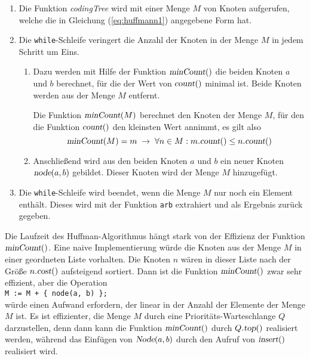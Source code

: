\begin{enumerate}
\item Die Funktion \textsl{codingTree} wird mit einer Menge $M$ von Knoten aufgerufen,
      welche die in Gleichung (\ref{eq:huffmann1}) angegebene Form hat.
\item Die \texttt{while}-Schleife veringert die Anzahl der Knoten in der Menge $M$
      in jedem Schritt um Eins.  
      \begin{enumerate}
      \item Dazu werden mit Hilfe der Funktion $\textsl{minCount}()$ die
            beiden Knoten $a$ und $b$ berechnet, f\"ur die der Wert von $\textsl{count}()$ minimal
            ist.  Beide Knoten werden aus der Menge $M$ entfernt.

            Die Funktion $\textsl{minCount}(M)$ berechnet den Knoten der Menge $M$, f\"ur den 
            die Funktion $\textsl{count}()$ den kleinsten Wert annimmt, es gilt also
            \[ \textsl{minCount}(M) = m \;\rightarrow\; 
               \forall n \in M: m.\textsl{count}() \leq n.\textsl{count}() \]
      \item Anschlie{\ss}end wird aus den beiden Knoten $a$ und $b$ ein neuer Knoten 
            $\textsl{node}(a,b)$ gebildet.
            Dieser Knoten wird der Menge $M$ hinzugef\"ugt.
      \end{enumerate}
\item Die \texttt{while}-Schleife wird beendet, wenn die Menge $M$ nur noch ein Element enth\"alt.
      Dieses wird mit der Funktion \texttt{arb} extrahiert und als Ergebnis zur\"uck gegeben.
\end{enumerate}
Die Laufzeit des Huffman-Algorithmus h\"angt stark von der Effizienz der Funktion $\textsl{minCount}()$.
Eine naive Implementierung w\"urde die Knoten aus der Menge $M$ in einer geordneten Liste vorhalten.
Die Knoten $n$ w\"aren in dieser Liste nach der Gr\"o{\ss}e $n.\textsl{cost}()$ aufsteigend sortiert.
Dann ist die Funktion $\textsl{minCount}()$ zwar sehr effizient, aber die Operation
\\[0.2cm]
\hspace*{1.3cm}
\texttt{M := M + \{ node(a, b) \};}
\\[0.2cm]
w\"urde einen Aufwand erfordern, der linear in der Anzahl der Elemente der Menge $M$ ist.
Es ist effizienter, die Menge $M$ durch eine Priorit\"ats-Warteschlange $Q$ darzustellen, denn
dann kann die Funktion $\textsl{minCount}()$ durch $Q.\textsl{top}()$ realisiert werden, w\"ahrend
das Einf\"ugen von $\textsl{Node}(a,b)$ durch den Aufruf von $\textsl{insert}()$ realisiert wird.

